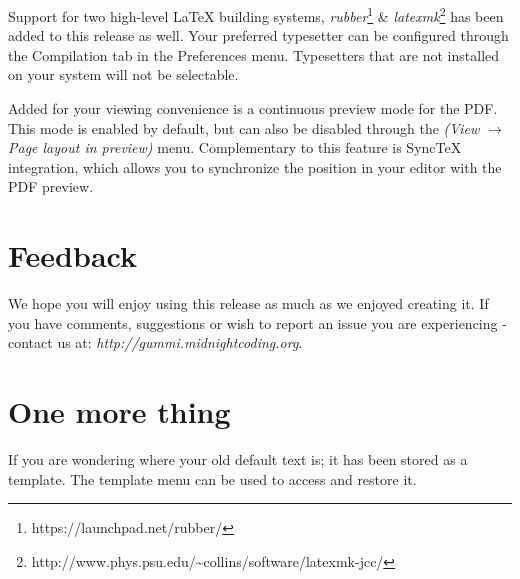 \documentclass[11pt]{article}
\begin{document}
Support for two high-level {\LaTeX} building systems, \emph{rubber}\footnote{https://launchpad.net/rubber/} \& \emph{latexmk}\footnote{http://www.phys.psu.edu/{\textasciitilde}collins/software/latexmk-jcc/} has been added to this release as well. Your preferred typesetter can be configured through the Compilation tab in the Preferences menu. Typesetters that are not installed on your system will not be selectable. 

Added for your viewing convenience is a continuous preview mode for the PDF. This mode is enabled by default, but can also be disabled through the \emph{(View $\rightarrow$ Page layout in preview)} menu. Complementary to this feature is SyncTeX integration, which allows you to synchronize the position in your editor with the PDF preview. 

\section{Feedback}
We hope you will enjoy using this release as much as we enjoyed creating it. If you have comments, suggestions or wish to report an issue you are experiencing - contact us at: \emph{http://gummi.midnightcoding.org}.

\section{One more thing}
If you are wondering where your old default text is; it has been stored as a template. The template menu can be used to access and restore it. 
\end{document}
